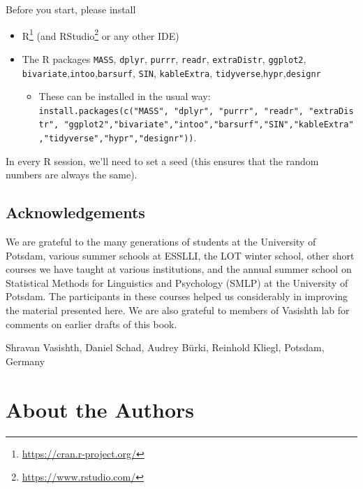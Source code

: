 \documentclass[12pt,]{krantz}
\providecommand{\tightlist}{%
  \setlength{\itemsep}{0pt}\setlength{\parskip}{0pt}}
\renewcommand{\href}[2]{#2\footnote{\url{#1}}}
\begin{document}
Before you start, please install

\begin{itemize}
\tightlist
\item
  \href{https://cran.r-project.org/}{R} (and \href{https://www.rstudio.com/}{RStudio} or any other IDE)
\item
  The R packages \texttt{MASS}, \texttt{dplyr}, \texttt{purrr}, \texttt{readr}, \texttt{extraDistr}, \texttt{ggplot2}, \texttt{bivariate},\texttt{intoo},\texttt{barsurf}, \texttt{SIN}, \texttt{kableExtra}, \texttt{tidyverse},\texttt{hypr},\texttt{designr}

  \begin{itemize}
  \tightlist
  \item
    These can be installed in the usual way: \texttt{install.packages(c("MASS",\ "dplyr",\ "purrr",\ "readr",\ "extraDistr",\ "ggplot2","bivariate","intoo","barsurf","SIN","kableExtra","tidyverse","hypr","designr"))}.
  \end{itemize}
\end{itemize}

In every R session, we'll need to set a seed (this ensures that the random numbers are always the same).

\hypertarget{acknowledgements}{%
\section{Acknowledgements}\label{acknowledgements}}

We are grateful to the many generations of students at the University of Potsdam, various summer schools at ESSLLI, the LOT winter school, other short courses we have taught at various institutions, and the annual summer school on Statistical Methods for Linguistics and Psychology (SMLP) at the University of Potsdam. The participants in these courses helped us considerably in improving the material presented here. We are also grateful to members of Vasishth lab for comments on earlier drafts of this book.

\begin{flushright}
Shravan Vasishth,
Daniel Schad,
Audrey Bürki,
Reinhold Kliegl,
Potsdam, Germany
\end{flushright}

\hypertarget{about-the-authors}{%
\chapter*{About the Authors}\label{about-the-authors}}
\end{document}
